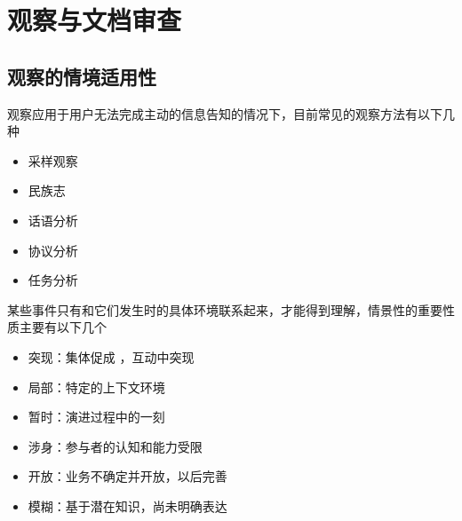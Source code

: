 \section{观察与文档审查}

\subsection{观察的情境适用性}
观察应用于用户无法完成主动的信息告知的情况下，目前常见的观察方法有以下几种
\vspace{-0.8em}
\begin{multicols}{3}
    \begin{itemize}
        \item 采样观察
        \item 民族志
        \item 话语分析
        \item 协议分析
        \item 任务分析
    \end{itemize}
\end{multicols}
\vspace{-1em}

某些事件只有和它们发生时的具体环境联系起来，才能得到理解，情景性的重要性质主要有以下几个
\vspace{-0.8em}
\begin{multicols}{2}
    \begin{itemize}
        \item 突现：集体促成 ，互动中突现 
        \item 局部：特定的上下文环境 
        \item 暂时：演进过程中的一刻
        \item 涉身：参与者的认知和能力受限
        \item 开放：业务不确定并开放，以后完善
        \item 模糊：基于潜在知识，尚未明确表达
    \end{itemize}
\end{multicols}
\vspace{-1em}

